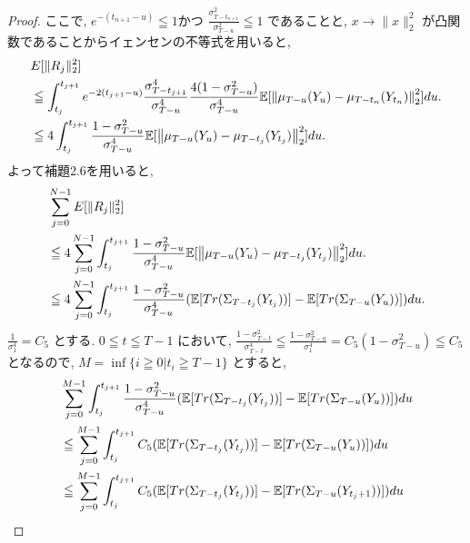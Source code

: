 \documentclass[11pt,a4paper]{ltjsarticle}
\theoremstyle{remark}
\begin{document}
\begin{proof}
    ここで, $e^{-(t_{n+1}-u)}\leqq 1$かつ $\frac{\sigma^2_{T-t_{n+1}}}{\sigma^2_{T-u}}\leqq 1$ であることと,
     $x\to \|x\|_2^2$ が凸関数であることからイェンセンの不等式を用いると, 
    \begin{align}
        &E[\|R_j\|^2_2]\notag\\
        &\leqq\int_{t_j}^{t_{j+1}}
        e^{-2(t_{j+1}-u)}
        \frac{\sigma^4_{T-t_{j+1}}}{\sigma^4_{T-u}}
        \frac{4(1-\sigma^2_{T-u})}{\sigma^4_{T-u}}
        \mathbb{E}[\left\|
            \mu_{T-u}(Y_u)
            -
            \mu_{T-t_n}(Y_{t_n})
        \right\|^2_2]
        du .\notag\\
        &\leqq 4\int_{t_j}^{t_{j+1}}
        \frac{1-\sigma^2_{T-u}}{\sigma^4_{T-u}}
        \mathbb{E}[\left\|
            \mu_{T-u}(Y_u)
            -
            \mu_{T-t_j}(Y_{t_j})
        \right\|^2_2]
        du .
    \end{align}
    よって補題2.6を用いると, 
    \begin{align}
        &\sum_{j=0}^{N-1}E[\|R_j\|^2_2]\notag\\
        &\leqq 4\sum_{j=0}^{N-1}\int_{t_j}^{t_{j+1}}
        \frac{1-\sigma^2_{T-u}}{\sigma^4_{T-u}}
        \mathbb{E}[\left\|
            \mu_{T-u}(Y_u)
            -
            \mu_{T-t_j}(Y_{t_j})
        \right\|^2_2]
        du .\notag\\
        &\leqq 4\sum_{j=0}^{N-1}\int_{t_j}^{t_{j+1}}
        \frac{1-\sigma^2_{T-u}}{\sigma^4_{T-u}}
        (\mathbb{E}[Tr(\Sigma_{T-t_j}(Y_{t_j}))]-\mathbb{E}[Tr(\Sigma_{T-u}(Y_u))])
        du .
    \end{align}
    $\frac{1}{\sigma^4_1}=C_5$ とする. $0\leqq t \leqq T-1$ において, $\frac{1-\sigma^2_{T-t}}{\sigma^4_{T-t}}\leqq \frac{1-\sigma^2_{T-u}}{\sigma^4_1}=C_5(1-\sigma^2_{T-u})\leqq C_5$ となるので, $M=\inf\{i\geqq 0|t_i\geqq T-1\}$ とすると, 
    \begin{align}
        &\sum_{j=0}^{M-1}\int_{t_j}^{t_{j+1}}
        \frac{1-\sigma^2_{T-u}}{\sigma^4_{T-u}}
        (\mathbb{E}[Tr(\Sigma_{T-t_j}(Y_{t_j}))]-\mathbb{E}[Tr(\Sigma_{T-u}(Y_u))])
        du \notag\\
        &\leqq 
        \sum_{j=0}^{M-1}\int_{t_j}^{t_{j+1}}
        C_5
        (\mathbb{E}[Tr(\Sigma_{T-t_j}(Y_{t_j}))]-\mathbb{E}[Tr(\Sigma_{T-u}(Y_u))])
        du \notag\\
        &\leqq 
        \sum_{j=0}^{M-1}\int_{t_j}^{t_{j+1}}
        C_5
        (\mathbb{E}[Tr(\Sigma_{T-t_j}(Y_{t_j}))]-\mathbb{E}[Tr(\Sigma_{T-u}(Y_{t_j+1}))])
        du \notag\\

\end{align}
\end{proof}
\end{document}
